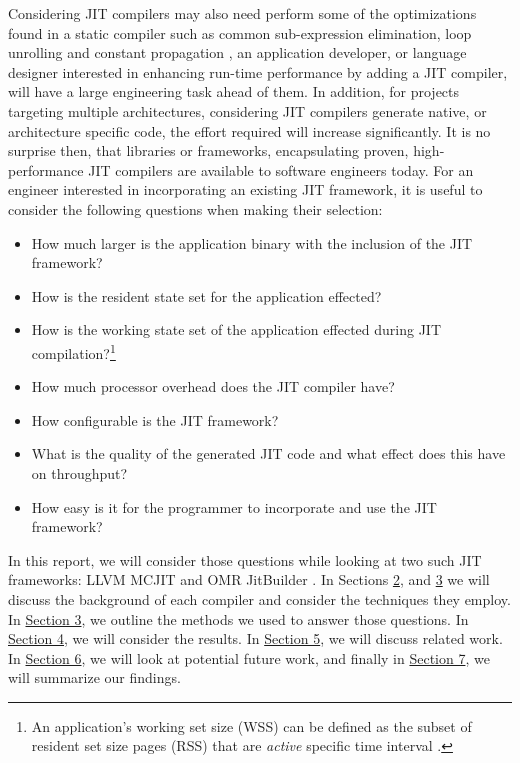 Considering JIT compilers may also need perform some of the optimizations found in a static compiler such as common sub-expression elimination, loop unrolling and constant propagation \cite{10.5555/2737838}, an application developer, or language designer interested in enhancing run-time performance by adding a JIT compiler, will have a large engineering task ahead of them.
In addition, for projects targeting multiple architectures, considering JIT compilers generate native, or architecture specific code, the effort required will increase significantly.
It is no surprise then, that libraries or frameworks, encapsulating proven, high-performance JIT compilers are available to software engineers today.
For an engineer interested in incorporating an existing JIT framework, it is useful to consider the following questions when making their selection: 
\begin{itemize}
    \item How much larger is the application binary with the inclusion of the JIT framework?
    \item How is the resident state set for the application effected?
    \item How is the working state set of the application effected during JIT compilation?\footnote{
        An application's working set size (WSS) can be defined as the subset of resident set size pages (RSS) that are \textit{active}   specific time interval \cite{BgreggWSS}.
    }
    \item How much processor overhead does the JIT compiler have?
    \item How configurable is the JIT framework?
    \item What is the quality of the generated JIT code and what effect does this have on throughput?
    \item How easy is it for the programmer to incorporate and use the JIT framework?
\end{itemize} 

In this report, we will consider those questions while looking at two such JIT frameworks: LLVM MCJIT \cite{LLVM_Web} and OMR JitBuilder \cite{10.5555/3172795.3172842}.
In Sections \hyperref[sec:llvm]{2}, and \hyperref[sec:jitbuilder]{3} we will discuss the background of each compiler and consider the techniques they employ.
In \hyperref[sec:methodology]{Section 3}, we outline the methods we used to answer those questions.
In \hyperref[sec:results]{Section 4}, we will consider the results.
In \hyperref[sec:related-work]{Section 5}, we will discuss related work.
In \hyperref[sec:future-work]{Section 6}, we will look at potential future work, and finally in \hyperref[sec:summary]{Section 7}, we will summarize our findings.